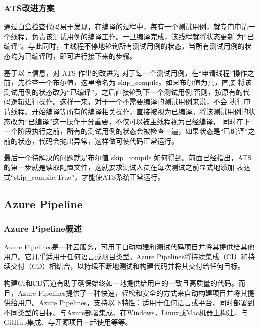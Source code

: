 \documentclass[UTF8]{ctexart}
\begin{document}
\subsubsection{ATS改进方案}
通过白盒检查代码易于发现，在编译的过程中，每有一个测试用例，就专门申请一个线程，负责该测试用例的编译工作。一旦编译完成，该线程就将状态更新
为“已编译”。与此同时，主线程不停地轮询所有测试用例的状态，当所有测试用例的状态均为已编译时，即可进行接下来的步骤。
\par
基于以上信息，对 ATS 作出的改进为:对于每一个测试用例，在“申请线程”操作之前，先检查一个布尔值，这里命名为 skip\_compile。如果布尔值为真，直接
将该测试用例的状态改为“已编译”，之后直接轮到下一个测试用例;否则，按原有的代码逻辑进行操作。这样一来，对于一个不需要编译的测试用例来说，不会
执行申请线程、开始编译等所有的编译相关操作，直接被视为已编译。将该测试用例的状态改为“已编译”这一操作十分重要，不仅可以被主线程视为已经编译，
同时在下一个阶段执行之前，所有的测试用例的状态会被检查一遍，如果状态是“已编译”之前的状态，代码会抛出异常，这样做可使代码正常运行。
\par
最后一个待解决的问题就是布尔值 skip\_compile 如何得到。前面已经指出，ATS 的第一步就是读取配置文件，这就要求测试人员在每次测试之前显式地添加
表达式“skip\_compile:True”，才能使ATS系统正常运行。

\subsection{Azure Pipeline}
\subsubsection{Azure Pipeline概述}
Azure Pipelines是一种云服务，可用于自动构建和测试代码项目并将其提供给其他用户。它几乎适用于任何语言或项目类型。Azure Pipelines将持续集成（CI）和持续交付（CD）相结合，以持续不断地测试和构建代码并将其交付给任何目标。
\par
构建CI和CD管道有助于确保始终如一地提供给用户的一致且高质量的代码。而且，Azure Pipelines提供了一种快速，轻松和安全的方式来自动构建项目并将其提供给用户。Azure Pipelines，支持以下特性：适用于任何语言或平台、同时部署到不同类型的目标、与Azure部署集成、在Windows，Linux或Mac机器上构建、与GitHub集成、与开源项目一起使用等等。
\end{document}
